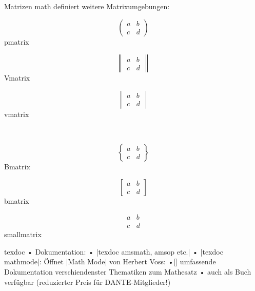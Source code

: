 \begin{frame}[fragile]{Matrizen}
\AMS{}math definiert weitere Matrixumgebungen:\\[2em]
\begin{minipage}{3cm}
\[\begin{pmatrix}
a & b \\ c & d
\end{pmatrix}\]
\centering pmatrix
\end{minipage}
\begin{minipage}{3cm}
\[\begin{Vmatrix}
a & b \\ c & d
\end{Vmatrix}\]
\centering Vmatrix
\end{minipage}
\begin{minipage}{3cm}
\[\begin{vmatrix}
a & b \\ c & d
\end{vmatrix}\]
\centering vmatrix
\end{minipage}
\\[2em]
\begin{minipage}{3cm}
\[\begin{Bmatrix}
a & b \\ c & d
\end{Bmatrix}\]
\centering Bmatrix
\end{minipage}
\begin{minipage}{3cm}
\[\begin{bmatrix}
a & b \\ c & d
\end{bmatrix}\]
\centering bmatrix
\end{minipage}
\begin{minipage}{3cm}
\[\begin{smallmatrix}
a & b \\ c & d
\end{smallmatrix}\]
\centering smallmatrix
\end{minipage}
\end{frame}

\begin{frame}{texdoc}
• Dokumentation:
• |texdoc amsmath, amsop etc.|
• |texdoc mathmode|: Öffnet |Math Mode| von Herbert Voss:
•[] umfassende Dokumentation verschiendenster Thematiken zum Mathesatz
• auch als Buch verfügbar (reduzierter Preis für DANTE-Mitglieder!)
\• 
\end{frame}

